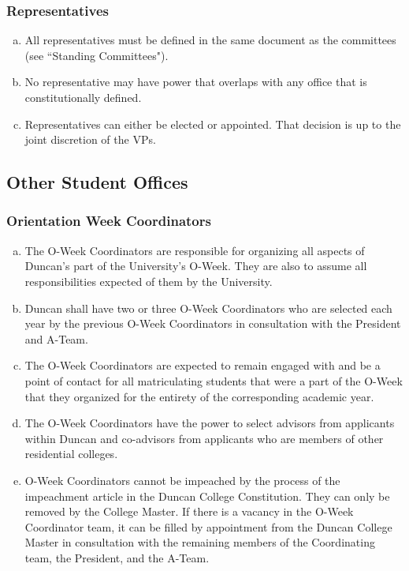\documentclass[USletter,12pt]{article}
\begin{document}
\subsubsection{Representatives}
	\begin{enumerate}[(a)]
	\item All representatives must be defined in the same document as the committees (see ``Standing Committees").
	\item No representative may have power that overlaps with any office that is constitutionally defined.
	\item Representatives can either be elected or appointed.  That decision is up to the joint discretion of the VPs.
	\end{enumerate}


\subsection{Other Student Offices}


\subsubsection{Orientation Week Coordinators}
\begin{enumerate}[(a)]
\item The O-Week Coordinators are responsible for organizing all aspects of Duncan's part of the University's O-Week.  They are also to assume all responsibilities expected of them by the University.
\item Duncan shall have two or three O-Week Coordinators who are selected each year by the previous O-Week Coordinators in consultation with the President and A-Team.
\item The O-Week Coordinators are expected to remain engaged with and be a point of contact for all matriculating students that were a part of the O-Week that they organized for the entirety of the corresponding academic year.
\item The O-Week Coordinators have the power to select advisors from applicants within Duncan and co-advisors from applicants who are members of other residential colleges.
\item O-Week Coordinators cannot be impeached by the process of the impeachment article in the Duncan College Constitution.  They can only be removed by the College Master.  If there is a vacancy in the O-Week Coordinator team, it can be filled by appointment from the Duncan College Master in consultation with the remaining members of the Coordinating team, the President, and the A-Team.
\end{enumerate}
\end{document}
